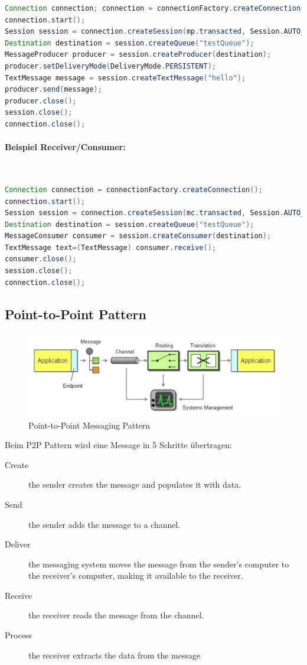 \begin{lstlisting}[language=java]
Connection connection; connection = connectionFactory.createConnection();
connection.start();
Session session = connection.createSession(mp.transacted, Session.AUTO_ACKNOWLEDGE);
Destination destination = session.createQueue("testQueue");
MessageProducer producer = session.createProducer(destination);
producer.setDeliveryMode(DeliveryMode.PERSISTENT);
TextMessage message = session.createTextMessage("hello");
producer.send(message);
producer.close();
session.close();
connection.close();
\end{lstlisting}

\paragraph{Beispiel Receiver/Consumer:} \hfill \\

\begin{lstlisting}[language=java]
Connection connection = connectionFactory.createConnection();
connection.start();
Session session = connection.createSession(mc.transacted, Session.AUTO_ACKNOWLEDGE);
Destination destination = session.createQueue("testQueue");
MessageConsumer consumer = session.createConsumer(destination);
TextMessage text=(TextMessage) consumer.receive();
consumer.close();
session.close();
connection.close();
\end{lstlisting}

\clearpage


\subsection{Point-to-Point Pattern}

\begin{figure}[h!]
	\centering
	\includegraphics[width=0.7\linewidth]{img/p2p_messaging_pattern}
	\caption{Point-to-Point Messaging Pattern}
	\label{fig:p2pmessagingpattern}
\end{figure}

Beim P2P Pattern wird eine Message in 5 Schritte übertragen:
\begin{description}
	\item[Create] the sender creates the message and populates it with data.
	\item[Send]the sender adds the message to a channel.
	\item[Deliver]the messaging system moves the message from the sender’s 
	computer to the receiver’s computer, making it available to the receiver.
	\item[Receive]the receiver reads the message from the channel.
	\item[Process]the receiver extracts the data from the message
\end{description}


